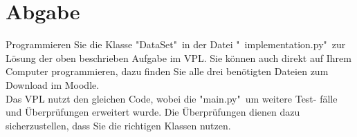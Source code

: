 \documentclass{article}
\begin{document}
\section{Abgabe}	
Programmieren Sie die Klasse "DataSet"\ in der Datei "\ implementation.py"\ zur
Lösung der oben beschrieben Aufgabe im VPL. Sie können auch direkt auf
Ihrem Computer programmieren, dazu finden Sie alle drei benötigten Dateien
zum Download im Moodle.\\[0.25cm]
Das VPL nutzt den gleichen Code, wobei die "main.py"\ um weitere Test-
fälle und Überprüfungen erweitert wurde. Die Überprüfungen dienen dazu
sicherzustellen, dass Sie die richtigen Klassen nutzen.
\end{document}
